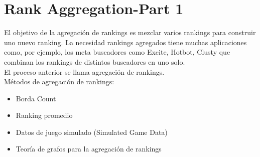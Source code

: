 \section{Rank Aggregation-Part 1 \cite{langville2012s}}

El objetivo de la agregación de rankings es mezclar varios rankings para construir uno nuevo ranking. La necesidad rankings agregados tiene muchas aplicaciones como, por ejemplo, los meta buscadores como Excite, Hotbot, Clusty que combinan los rankings de distintos buscadores en uno solo.\\

El proceso anterior se llama agregación de rankings.\\

Métodos de agregación de rankings:
\begin{itemize}
\item Borda Count
\item Ranking promedio
\item Datos de juego simulado (Simulated Game Data)
\item Teoría de grafos para la agregación de rankings
\end{itemize}